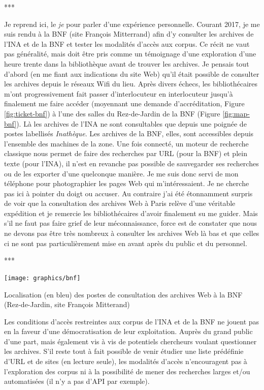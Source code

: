\documentclass[symmetric,justified,marginals=raggedouter]{tufte-book}
\begin{document}
\begin{center}
	***
\end{center}

\noindent Je reprend ici, le \textit{je} pour parler d'une expérience personnelle. Courant 2017, je me suis rendu à la BNF (site François Mitterrand) afin d'y consulter les archives de l'INA et de la BNF et tester les modalités d'accès aux corpus. Ce récit ne vaut pas généralité, mais doit être pris comme un témoignage d'une exploration d'une heure trente dans la bibliothèque avant de trouver les archives. Je pensais tout d'abord (en me fiant aux indications du site Web) qu'il était possible de consulter les archives depuis le réseaux Wifi du lieu. Après divers échecs, les bibliothécaires m'ont progressivement fait passer d'interlocuteur en interlocuteur jusqu'à finalement me faire accéder (moyennant une demande d'accréditation, Figure \ref{fig:ticket-bnf}) à l'une des salles du Rez-de-Jardin de la BNF (Figure \ref{fig:map-bnf}). Là les archives de l'INA ne sont consultables que depuis une poignée de postes labellisés \textit{Inathèque}. Les archives de la BNF, elles, sont accessibles depuis l'ensemble des  machines de la zone. Une fois connecté, un moteur de recherche classique nous permet de faire des recherches par URL (pour la BNF) et plein texte (pour l'INA), il n'est en revanche pas possible de sauvegarder ses recherches ou de les exporter d'une quelconque manière. Je me suis donc servi de mon téléphone pour photographier les pages Web qui m'intéressaient. Je ne cherche pas ici à pointer du doigt ou accuser. Au contraire j'ai été étonnamment surpris de voir que la consultation des archives Web à Paris relève d'une véritable expédition et je remercie les bibliothécaires d'avoir finalement su me guider. Mais s'il ne faut pas faire grief de leur méconnaissance, force est de constater que nous ne devons pas être très nombreux à consulter les archives Web là bas et que celles ci ne sont pas particulièrement mise en avant après du public et du personnel.

\begin{center}
	***
\end{center}

\begin{marginfigure}%
  \texttt{[image: graphics/bnf]}
  \caption{Localisation (en bleu) des postes de consultation des archives Web à la BNF (Rez-de-Jardin, site François Mitterand)}
  \label{fig:map-bnf}
\end{marginfigure} 
  
\noindent Les conditions d'accès restreintes aux corpus de l'INA et de la BNF ne jouent pas en la faveur d'une démocratisation de leur exploitation. Auprès du grand public d'une part, mais également vis à vis de potentiels chercheurs voulant questionner les archives. S'il reste tout à fait possible de venir étudier une liste prédéfinie d'URL et de sites (en lecture seule), les modalités d'accès n'encouragent pas à l'exploration des corpus ni à la possibilité de mener des recherches larges et/ou automatisées (il n'y a pas d'API par exemple). 
\end{document}
